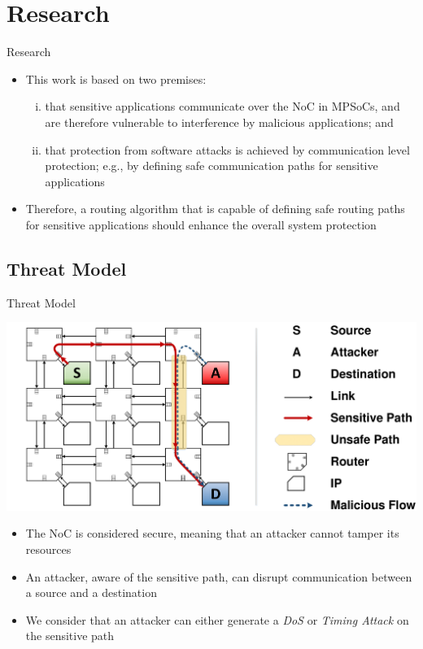 \section{Research}\label{sec:proposal}
\begin{frame}{Research}
	\begin{itemize}
		\setlength{\itemsep}{1em}
		\item<1-> This work is based on two premises:
		
		\begin{enumerate}[(i)]
			\setlength{\itemsep}{1em}
			\item<1-> that sensitive applications communicate over the NoC in MPSoCs, and are therefore vulnerable to interference by malicious applications; and
			
			\item<1-> that protection from software attacks is achieved by communication level protection; e.g., by defining safe communication paths for sensitive applications
		\end{enumerate}
		
		\item<1-> Therefore, a routing algorithm that is capable of defining safe routing paths for sensitive applications should enhance the overall system protection
	\end{itemize}
\end{frame}

\subsection{Threat Model}
\begin{frame}{Threat Model}
	\begin{center}
		\includegraphics[width=0.75\linewidth]{images/threat_model/timing-attack.pdf}
	\end{center}
	\begin{itemize}
		\item<only@1> The NoC is considered secure, meaning that an attacker cannot tamper its resources
		
		\item<only@1> An attacker, aware of the sensitive path, can disrupt communication between a source and a destination
		
		\item<only@1> We consider that an attacker can either generate a \emph{DoS} or \emph{Timing Attack} on the sensitive path
	\end{itemize}
\end{frame}

